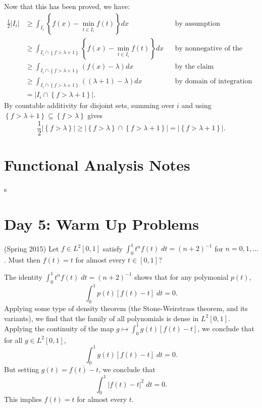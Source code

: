 \documentclass[answers]{exam}
\theoremstyle{problemstyle}
\newcommand{\1}[1]{\textbf{1}_{\left[#1\right]}} %
\begin{document}
\begin{questions}
\begin{solution}
  Now that this has been proved, we have:
  \begin{align*}
    \frac{1}{2}|I_{i}| &\geq \int_{I_{i}} \left\{ f(x)-\min_{t\in {\bar{I}_{i}}}f(t) \right\} dx
    &&\text{by assumption}\\
                       &\geq\int_{I_{i}\cap \left\{ f > \lambda+1 \right\}} \left\{ f(x)-\min_{t\in{\bar{I}_{i}}}f(t) \right\} dx
    &&\text{by nonnegative of the integrand}\\
                       &\geq \int_{I_{i}\cap \left\{ f > \lambda+1 \right\}} (f(x)-\lambda) dx
    &&\text{by the claim}\\
                       &\geq \int_{I_{i}\cap \left\{ f > \lambda+1 \right\}} ((\lambda+1)-\lambda) dx
    &&\text{by domain of integration}\\
                       &= \left|I_{i} \cap \left\{  f> \lambda+1\right\} \right|.
  \end{align*}
  By countable additivity for disjoint sets, summing over $i$ and using $\left\{f>\lambda+1 \right\}\subseteq
 \left\{f>\lambda \right\}$ gives
  \begin{equation*}
    \frac{1}{2}\left| \left\{f >\lambda \right\} \right|  \geq \left| \left\{ f>\lambda \right\}\cap \left\{ f>\lambda+1 \right\} \right| = \left| \left\{ f>\lambda+1 \right\} \right|.
  \end{equation*}
\end{solution}




\newpage
\section{Functional Analysis Notes}

s




\newpage
\section*{Day 5: Warm Up Problems}

\question (Spring 2015) Let $f \in L^2[0,1]$ satisfy $\int_0^1 t^n f(t)\; dt = (n+2)^{-1}$ for $n = 0, 1,\dots$. Must then $f(t) = t$ for almost every $t \in [0,1]$?
\begin{solution}
    The identity $\int_0^1 t^n f(t)\; dt = (n+2)^{-1}$ shows that for any polymonial $p(t)$,
    \[ \int_0^1 p(t) [f(t) - t]\; dt = 0. \]
    Applying some type of density theorem (the Stone-Weirstrass theorem, and its variants), we find that the family of all polynomials is dense in $L^2[0,1]$. Applying the continuity of the map $g \mapsto \int_0^1 g(t) [f(t) - t]$, we conclude that for all $g \in L^2[0,1]$,
    \[ \int_0^1 g(t) [f(t) - t]\; dt = 0. \]
    But setting $g(t) = \overline{f(t) - t}$, we conclude that
    \[ \int_0^1 |f(t) - t|^2\; dt = 0. \]
    This implies $f(t) = t$ for almost every $t$.
\end{solution}


\end{questions}
\end{document}
